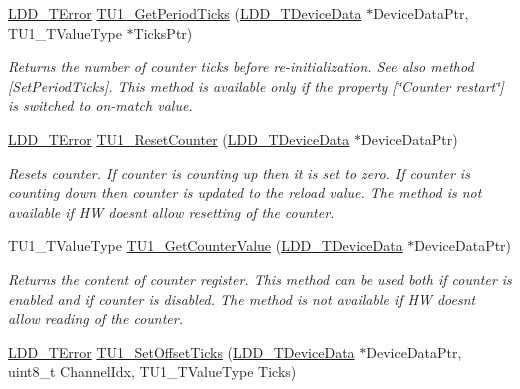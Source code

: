 \begin{DoxyCompactItemize}
\hyperlink{group___p_e___types__module_ga24c2b045fd04e79e85f261ce4df35588}{L\+D\+D\+\_\+\+T\+Error} \hyperlink{group___t_u1__module_gaa378924b104d5f8423920b110e8941e9}{T\+U1\+\_\+\+Get\+Period\+Ticks} (\hyperlink{group___p_e___types__module_gac5cf1362f1f0e3a2ce71b1bf2276d091}{L\+D\+D\+\_\+\+T\+Device\+Data} $\ast$Device\+Data\+Ptr, T\+U1\+\_\+\+T\+Value\+Type $\ast$Ticks\+Ptr)
\begin{DoxyCompactList}\small\item\em Returns the number of counter ticks before re-\/initialization. See also method \mbox{[}Set\+Period\+Ticks\mbox{]}. This method is available only if the property \mbox{[}\char`\"{}\+Counter restart\char`\"{}\mbox{]} is switched to \textquotesingle{}on-\/match\textquotesingle{} value. \end{DoxyCompactList}\item 
\hyperlink{group___p_e___types__module_ga24c2b045fd04e79e85f261ce4df35588}{L\+D\+D\+\_\+\+T\+Error} \hyperlink{group___t_u1__module_ga8086edd7db7d8006a1bb8f3882a6706b}{T\+U1\+\_\+\+Reset\+Counter} (\hyperlink{group___p_e___types__module_gac5cf1362f1f0e3a2ce71b1bf2276d091}{L\+D\+D\+\_\+\+T\+Device\+Data} $\ast$Device\+Data\+Ptr)
\begin{DoxyCompactList}\small\item\em Resets counter. If counter is counting up then it is set to zero. If counter is counting down then counter is updated to the reload value. The method is not available if HW doesn\textquotesingle{}t allow resetting of the counter. \end{DoxyCompactList}\item 
T\+U1\+\_\+\+T\+Value\+Type \hyperlink{group___t_u1__module_ga1c2dce8338fb8784787fca8a8162ddbc}{T\+U1\+\_\+\+Get\+Counter\+Value} (\hyperlink{group___p_e___types__module_gac5cf1362f1f0e3a2ce71b1bf2276d091}{L\+D\+D\+\_\+\+T\+Device\+Data} $\ast$Device\+Data\+Ptr)
\begin{DoxyCompactList}\small\item\em Returns the content of counter register. This method can be used both if counter is enabled and if counter is disabled. The method is not available if HW doesn\textquotesingle{}t allow reading of the counter. \end{DoxyCompactList}\item 
\hyperlink{group___p_e___types__module_ga24c2b045fd04e79e85f261ce4df35588}{L\+D\+D\+\_\+\+T\+Error} \hyperlink{group___t_u1__module_gabc1056f77dad3dc9f11ccb4c2f3a9b47}{T\+U1\+\_\+\+Set\+Offset\+Ticks} (\hyperlink{group___p_e___types__module_gac5cf1362f1f0e3a2ce71b1bf2276d091}{L\+D\+D\+\_\+\+T\+Device\+Data} $\ast$Device\+Data\+Ptr, uint8\+\_\+t Channel\+Idx, T\+U1\+\_\+\+T\+Value\+Type Ticks)

\end{DoxyCompactItemize}
